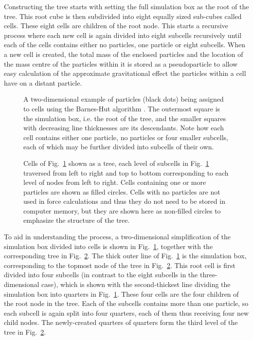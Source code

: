 \documentclass[english, twoside]{HYgradu}
\begin{document}
Constructing the tree starts with setting the full simulation box as the root of the tree. This root cube is then subdivided into eight equally sized sub-cubes called cells. These eight cells are children of the root node. This starts a recursive process where each new cell is again divided into eight subcells recursively until each of the cells contains either no particles, one particle or eight subcells. When a new cell is created, the total mass of the enclosed particles and the location of the mass centre of the particles within it is stored as a pseudoparticle to allow easy calculation of the approximate gravitational effect the particles within a cell have on a distant particle.

\begin{figure}
    \centering
    
    \caption{A two-dimensional example of particles (black dots) being assigned to cells using the Barnes-Hut algorithm \citep{barnes1986hierarchical}. The outermost square is the simulation box, i.e. the root of the tree, and the smaller squares with decreasing line thicknesses are its descendants. Note how each cell contains either one particle, no particles or four smaller subcells, each of which may be further divided into subcells of their own.}\label{fig:tree-box}
\end{figure}

\begin{figure}
    \centering
    \def\svgwidth{\columnwidth}
    
    \caption{Cells of Fig.\ \ref{fig:tree-box} shown as a tree, each level of subcells in Fig.\ \ref{fig:tree-box} traversed from left to right and top to bottom corresponding to each level of nodes from left to right. Cells containing one or more particles are shown as filled circles. Cells with no particles are not used in force calculations and thus they do not need to be stored in computer memory, but they are shown here as non-filled circles to emphasize the structure of the tree.}\label{fig:tree}
\end{figure}

To aid in understanding the process, a two-dimensional simplification of the simulation box divided into cells is shown in Fig.\ \ref{fig:tree-box}, together with the corresponding tree in Fig.\ \ref{fig:tree}. The thick outer line of Fig.\ \ref{fig:tree-box} is the simulation box, corresponding to the topmost node of the tree in Fig.\ \ref{fig:tree}. This root cell is first divided into four subcells (in contrast to the eight subcells in the three-dimensional case), which is shown with the second-thickest line dividing the simulation box into quarters in Fig.\ \ref{fig:tree-box}. These four cells are the four children of the root node in the tree. Each of the subcells contains more than one particle, so each subcell is again split into four quarters, each of them thus receiving four new child nodes. The newly-created quarters of quarters form the third level of the tree in Fig.\ \ref{fig:tree}.
\end{document}

